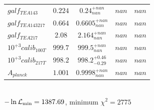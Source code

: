 \begin{tabular}{|l|c|c|c|c|}
$galf_{TE A 143 }$ &$0.224$ & $0.24_{nan}^{+nan}$ & $nan$ & $nan$ \\ 
$galf_{TE A 143 217 }$ &$0.664$ & $0.6605_{nan}^{+nan}$ & $nan$ & $nan$ \\ 
$galf_{TE A 217 }$ &$2.08$ & $2.164_{nan}^{+nan}$ & $nan$ & $nan$ \\ 
$10^{+3}calib_{100T }$ &$999.7$ & $999.5_{nan}^{+nan}$ & $nan$ & $nan$ \\ 
$10^{+3}calib_{217T }$ &$998.2$ & $998.2_{-0.29}^{+0.46}$ & $nan$ & $nan$ \\ 
$A_{planck }$ &$1.001$ & $0.9998_{nan}^{+nan}$ & $nan$ & $nan$ \\ 
\hline 
 \end{tabular} \\ 
$-\ln{\cal L}_\mathrm{min} =1387.69$, minimum $\chi^2=2775$ \\ 
